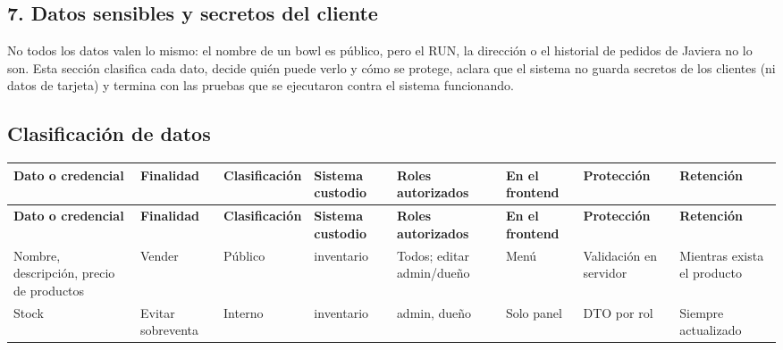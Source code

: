
\begin{landscape}
\section{7. Datos sensibles y secretos del cliente}
No todos los datos valen lo mismo: el nombre de un bowl es público, pero el RUN, la dirección o el historial de pedidos de Javiera no lo son. Esta sección clasifica cada dato, decide quién puede verlo y cómo se protege, aclara que el sistema no guarda secretos de los clientes (ni datos de tarjeta) y termina con las pruebas que se ejecutaron contra el sistema funcionando.

\subsection{Clasificación de datos}
\vspace{0.6em}
{\scriptsize
\setlength{\LTpre}{0pt}\setlength{\LTpost}{0pt}
\setlength{\tabcolsep}{3pt}\renewcommand{\arraystretch}{1.15}
\begin{longtable}{|>{\raggedright\arraybackslash}p{}|>{\raggedright\arraybackslash}p{}|>{\raggedright\arraybackslash}p{}|>{\raggedright\arraybackslash}p{}|>{\raggedright\arraybackslash}p{}|>{\raggedright\arraybackslash}p{}|>{\raggedright\arraybackslash}p{}|>{\raggedright\arraybackslash}p{}|}
\hline
\textbf{Dato o credencial} & \textbf{Finalidad} & \textbf{Clasificación} & \textbf{Sistema custodio} & \textbf{Roles autorizados} & \textbf{En el frontend} & \textbf{Protección} & \textbf{Retención} \\ \hline
\endfirsthead
\hline
\textbf{Dato o credencial} & \textbf{Finalidad} & \textbf{Clasificación} & \textbf{Sistema custodio} & \textbf{Roles autorizados} & \textbf{En el frontend} & \textbf{Protección} & \textbf{Retención} \\ \hline
\endhead
Nombre, descripción, precio de productos & Vender & Público & inventario & Todos; editar admin/dueño & Menú & Validación en servidor & Mientras exista el producto \\ \hline
Stock & Evitar sobreventa & Interno & inventario & admin, dueño & Solo panel & DTO por rol & Siempre actualizado \\ \hline

\end{longtable}}
\end{landscape}
